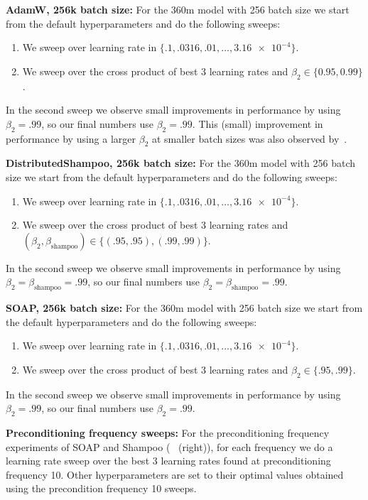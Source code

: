 \documentclass{article} %
\begin{document}
\textbf{AdamW, 256k batch size:}
For the 360m model with 256 batch size we start from the default hyperparameters and do the following sweeps:
\begin{enumerate}
	\item We sweep over learning rate in $\{.1, .0316, .01,\ldots, \num{3.16e-4}\}$.
	\item We sweep over the cross product of best 3 learning rates and $\beta_2 \in \{0.95,0.99\}$.
\end{enumerate}

In the second sweep we observe small improvements in performance by using $\beta_2 = .99$, so our final numbers use $\beta_2 = .99$. This (small) improvement in performance by using a larger $\beta_2$ at smaller batch sizes was also observed by~\citet{porian,zhaoscience}.

\textbf{DistributedShampoo, 256k batch size:}
For the 360m model with 256 batch size we start from the default hyperparameters and do the following sweeps:
\begin{enumerate}
	\item We sweep over learning rate in $\{.1, .0316, .01,\ldots, \num{3.16e-4}\}$.
	\item We sweep over the cross product of best 3 learning rates and $(\beta_2, \beta_{\text{shampoo}}) \in \{(.95, .95), (.99, .99)\}$.
\end{enumerate}

In the second sweep we observe small improvements in performance by using $\beta_2 = \beta_{\text{shampoo}} = .99$, so our final numbers use $\beta_2 = \beta_{\text{shampoo}} = .99$. 

\textbf{SOAP, 256k batch size:}
For the 360m model with 256 batch size we start from the default hyperparameters and do the following sweeps:
\begin{enumerate}
	\item We sweep over learning rate in $\{.1, .0316, .01,\ldots, \num{3.16e-4}\}$.
	\item We sweep over the cross product of best 3 learning rates and $\beta_2 \in \{.95, .99\}$.
\end{enumerate}

In the second sweep we observe small improvements in performance by using $\beta_2 = .99$, so our final numbers use $\beta_2 = .99$. 

\textbf{Preconditioning frequency sweeps:} For the preconditioning frequency experiments of SOAP and Shampoo (~ (right)), for each frequency we do a learning rate sweep over the best 3 learning rates found at preconditioning frequency 10. Other hyperparameters are set to their optimal values obtained using the precondition frequency 10 sweeps.
\end{document}
